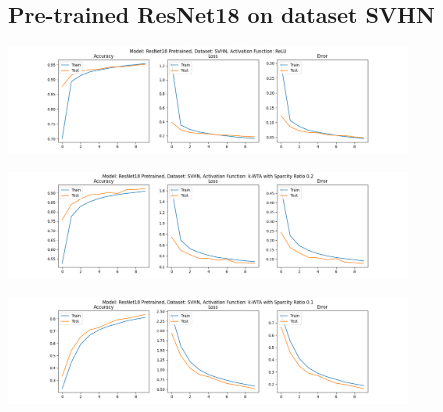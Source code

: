\documentclass[a4paper]{article}
\begin{document}
		\subsection{Pre-trained ResNet18 on dataset SVHN}
			\begin{center}
				\centering
				\includegraphics[width=400px,keepaspectratio]{ResNet18_SVHN_ReLU_Pretrained.png}
			\end{center}
			\begin{center}
				\centering
				\includegraphics[width=400px,keepaspectratio]{ResNet18_SVHN_k-WTA_0.2_Pretrained.png}
			\end{center}
			\begin{center}
				\centering
				\includegraphics[width=400px,keepaspectratio]{ResNet18_SVHN_k-WTA_0.1_Pretrained.png}
			\end{center}
		
\end{document}
